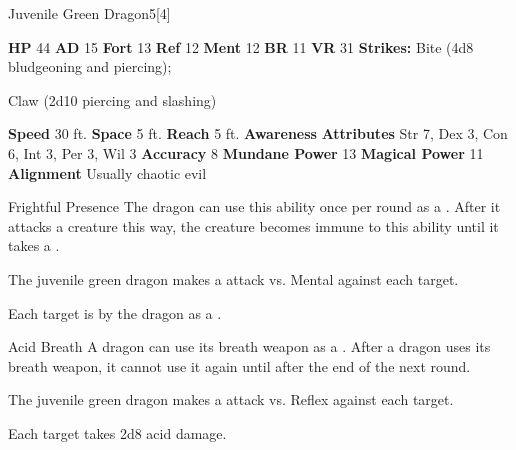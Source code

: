   \begin{monsubsection}{Juvenile Green Dragon}{5}[4]
    \vspace{-1em}\vspace{-1em}
    \vspace{0em}

    
    

    \begin{spellcontent}
      \begin{spelltargetinginfo}
        \pari \textbf{HP} 44 \monsep
          \textbf{AD} 15 \monsep
          \textbf{Fort} 13 \monsep
          \textbf{Ref} 12 \monsep
          \textbf{Ment} 12
        \pari \textbf{BR} 11 \monsep
        \textbf{VR} 31
        \pari \textbf{Strikes:}
            Bite  (4d8 bludgeoning and piercing);
\par Claw  (2d10 piercing and slashing)
      \end{spelltargetinginfo}
    \end{spellcontent}
    \begin{monsterfooter}
      \pari \textbf{Speed} 30 ft. \monsep
        \textbf{Space} 5 ft. \monsep
        \textbf{Reach} 5 ft.
      \pari \textbf{Awareness} 
      \pari \textbf{Attributes}
        Str 7, Dex 3,
        Con 6, Int 3,
        Per 3, Wil 3
      \pari \textbf{Accuracy} 8 \monsep
        \textbf{Mundane Power} 13 \monsep
      \textbf{Magical Power} 11
      \pari \textbf{Alignment} Usually chaotic evil
    \end{monsterfooter}
  \end{monsubsection}
  \begin{freeability}{Frightful Presence}
      The dragon can use this ability once per round as a .
      After it attacks a creature this way, the creature becomes immune to this ability until it takes a .
      \par The juvenile green dragon makes a  attack
        vs. Mental against each target.
    
    \hit Each target is  by the dragon as a .
    \end{freeability}
  

    \begin{freeability}{Acid Breath}
      A dragon can use its breath weapon as a .
      After a dragon uses its breath weapon, it cannot use it again until after the end of the next round.
      \par The juvenile green dragon makes a  attack
        vs. Reflex against each target.
    
    \hit Each target takes 2d8 acid damage.
    \end{freeability}
  
